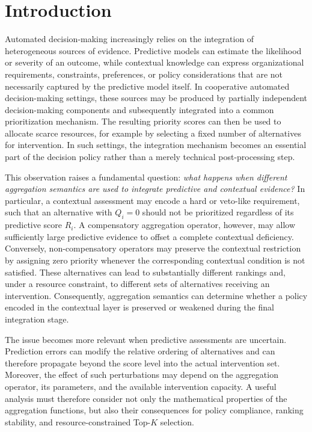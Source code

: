 \documentclass[mathematics,article,submit,moreauthors]{Definitions/mdpi}
\begin{document}

\section{Introduction}
\label{sec:introduction}

Automated decision-making increasingly relies on the integration of heterogeneous
sources of evidence. Predictive models can estimate the likelihood or severity
of an outcome, while contextual knowledge can express organizational
requirements, constraints, preferences, or policy considerations that are not
necessarily captured by the predictive model itself. In cooperative automated
decision-making settings, these sources may be produced by partially
independent decision-making components and subsequently integrated into a
common prioritization mechanism. The resulting priority scores can then be
used to allocate scarce resources, for example by selecting a fixed number of
alternatives for intervention. In such settings, the integration mechanism
becomes an essential part of the decision policy rather than a merely
technical post-processing step.

This observation raises a fundamental question: \emph{what happens when
different aggregation semantics are used to integrate predictive and
contextual evidence?} In particular, a contextual assessment may encode a
hard or veto-like requirement, such that an alternative with $Q_i=0$ should
not be prioritized regardless of its predictive score $R_i$. A compensatory
aggregation operator, however, may allow sufficiently large predictive
evidence to offset a complete contextual deficiency. Conversely,
non-compensatory operators may preserve the contextual restriction by
assigning zero priority whenever the corresponding contextual condition is
not satisfied. These alternatives can lead to substantially different
rankings and, under a resource constraint, to different sets of alternatives
receiving an intervention. Consequently, aggregation semantics can determine
whether a policy encoded in the contextual layer is preserved or weakened
during the final integration stage.

The issue becomes more relevant when predictive assessments are uncertain.
Prediction errors can modify the relative ordering of alternatives and can
therefore propagate beyond the score level into the actual intervention set.
Moreover, the effect of such perturbations may depend on the aggregation
operator, its parameters, and the available intervention capacity. A useful
analysis must therefore consider not only the mathematical properties of the
aggregation functions, but also their consequences for policy compliance,
ranking stability, and resource-constrained Top-$K$ selection.
\end{document}
